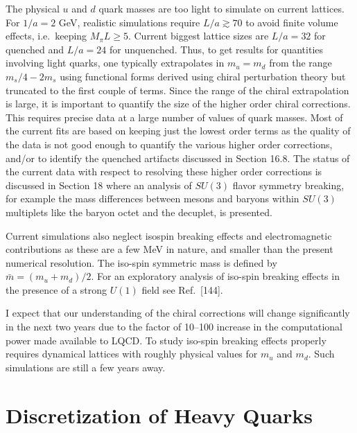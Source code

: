 The physical $u$ and $d$ quark masses are too light to simulate on current lattices. For $1/a = 2$ GeV, realistic simulations require $L/a \gtrsim 70$ to avoid finite volume effects, i.e.~keeping $M_\pi L \ge 5$. Current biggest lattice sizes are $L/a = 32$ for quenched and $L/a = 24$ for unquenched. Thus, to get results for quantities involving light quarks, one typically extrapolates in $m_u = m_d$ from the range $m_s/4 - 2m_s$ using functional forms derived using chiral perturbation theory but truncated to the first couple of terms. Since the range of the chiral extrapolation is large, it is important to quantify the size of the higher order chiral corrections. This requires precise data at a large number of values of quark masses. Most of the current fits are based on keeping just the lowest order terms as the quality of the data is not good enough to quantify the various higher order corrections, and/or to identify the quenched artifacts discussed in Section 16.8. The status of the current data with respect to resolving these higher order corrections is discussed in Section 18 where an analysis of $SU(3)$ flavor symmetry breaking, for example the mass differences between mesons and baryons within $SU(3)$ multiplets like the baryon octet and the decuplet, is presented.

Current simulations also neglect isospin breaking effects and electromagnetic contributions as these are a few MeV in nature, and smaller than the present numerical resolution. The iso-spin symmetric mass is defined by $\bar{m} = (m_u + m_d)/2$. For an exploratory analysis of iso-spin breaking effects in the presence of a strong $U(1)$ field see Ref.~[144].

I expect that our understanding of the chiral corrections will change significantly in the next two years due to the factor of 10--100 increase in the computational power made available to LQCD. To study iso-spin breaking effects properly requires dynamical lattices with roughly physical values for $m_u$ and $m_d$. Such simulations are still a few years away.

\section{Discretization of Heavy Quarks}

